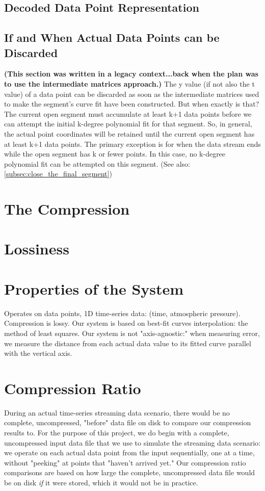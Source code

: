 \documentclass{article}
\begin{document}
\subsection{Decoded Data Point Representation}

\subsection{If and When Actual Data Points can be Discarded}
\label{subsec:when_can_discard_point_coords}
\textbf{(This section was written in a legacy context...back when the plan was to use the intermediate matrices approach.)}
The y value (if not also the t value) of a data point can be discarded as soon as the intermediate matrices used to make the segment’s curve fit have been constructed. But when exactly is that? The current open segment must accumulate at least k+1 data points before we can attempt the initial k-degree polynomial fit for that segment. So, in general, the actual point coordinates will be retained until the current open segment has at least k+1 data points. The primary exception is for when the data stream ends while the open segment has k or fewer points. In this case, no k-degree polynomial fit can be attempted on this segment. (See also: \ref{subsec:close_the_final_segment})



\section{The Compression}


\section{Lossiness}


\section{Properties of the System}
Operates on data points, 1D time-series data: (time, atmospheric pressure).
Compression is lossy.
Our system is based on best-fit curves interpolation: the method of least squares.
Our system is not "axis-agnostic:" when measuring error, we measure the distance from each actual data value to its fitted curve parallel with the vertical axis.

\section{Compression Ratio}
During an actual time-series streaming data scenario, there would be no complete, uncompressed, "before" data file on disk to compare our compression results to. For the purpose of this project, we do begin with a complete, uncompressed input data file that we use to simulate the streaming data scenario: we operate on each actual data point from the input sequentially, one at a time, without "peeking" at points that "haven't arrived yet." Our compression ratio comparisons are based on how large the complete, uncompressed data file would be on disk \textit{if} it were stored, which it would not be in practice.
\end{document}
